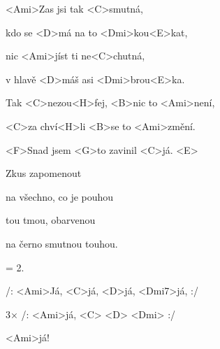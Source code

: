 

\zs
<Ami>Zas jsi tak <C>smutná,

kdo se <D>má na to <Dmi>kou<E>kat,

nic <Ami>jíst ti ne<C>chutná,

v hlavě <D>máš asi <Dmi>brou<E>ka.
\ks

\zr
Tak <C>nezou<H>fej, <B>nic to <Ami>není,

<C>za chví<H>li <B>se to <Ami>změní.

<F>Snad jsem <G>to zavinil <C>já. <E>
\kr

\zs
Zkus zapomenout

na všechno, co je pouhou

tou tmou, obarvenou

na černo smutnou touhou.
\ks

\zr \kr

\zs
= 2.
\ks

\zr \kr

/: <Ami>Já, <C>já, <D>já, <Dmi7>já, :/

3× /: <Ami>já, <C> <D> <Dmi> :/

<Ami>já!

\kp






